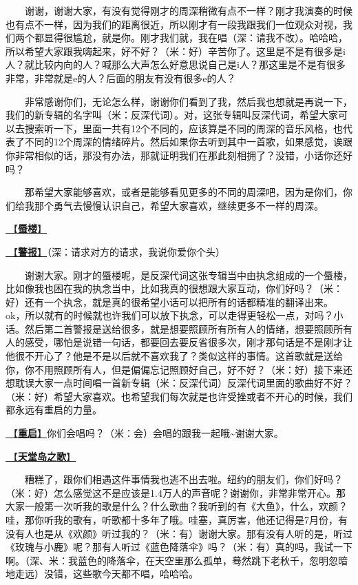 \documentclass[]{ctexbook}
\begin{document}
  谢谢，谢谢大家，有没有觉得刚才的周深稍微有点不一样？刚才我演奏的时候也有点不一样，因为我们的距离很近，所以刚才有一段我跟我们一位观众对视，我们两个都显得很尴尬，就是你。刚才我们就，我在唱（深：请我不改）。哈哈哈，所以希望大家跟我嗨起来，好不好？（米：好）辛苦你了。这里是不是有很多是i人？就比较内向的人？喊那么大声怎么好意思说自己是i人？那这里是不是有很多非常，非常就是e的人？后面的朋友有没有很多e的人？

  非常感谢你们，无论怎么样，谢谢你们看到了我，然后我也想就是再说一下，我们的新专辑的名字叫（米：反深代词）。对，这张专辑叫反深代词，希望大家可以去搜索听一下，里面一共有12个不同的，应该算是不同的周深的音乐风格，也代表了不同的12个周深的情绪碎片。然后如果你去听到其中一首歌，如果感觉，诶跟你非常相似的话，那没有办法，那就证明我们在那此刻相拥了？没错，小话你还好吗？

  那希望大家能够喜欢，或者是能够看见更多的不同的周深吧，因为是你们，你们给我那个勇气去慢慢认识自己，希望大家喜欢，继续更多不一样的周深。

\hyperref[mirage]{🎵【\textbf{蜃楼}】}

\hyperref[the-giver]{🎵【\textbf{警报}】}（深：请求对方的请求，我说你爱你个头）

  谢谢大家。刚才的蜃楼呢，是反深代词这张专辑当中由执念组成的一个蜃楼，比如像我也困在我的执念当中，比如我真的很想跟大家互动，你们好吗？（米：好）还有一个执念，就是真的很希望小话可以把所有的话都精准的翻译出来。ok，所以就有的时候就也许我们可以放下执念，可以走得更轻松一点，对吗？小话。然后第二首警报是送给很多，就是想要照顾所有所有人的情绪，想要照顾所有人的感受，哪怕是说错一句话，都要回去要反省很多次，刚才那句话是不是刚才让他很不开心了？他是不是以后就不喜欢我了？类似这样的事情。这首歌就是送给你，你不用照顾所有人，但是偏偏忘记照顾好自己，好不好？（米：好）接下来还想耽误大家一点时间唱一首新专辑（米：反深代词）反深代词里面的歌曲好不好？（米：好）希望大家喜欢。也希望我们每次就是也许受挫或者不开心的时候，我们都永远有重启的力量。

\hyperref[restart]{🎵【\textbf{重启}】}你们会唱吗？（米：会）会唱的跟我一起哦\textasciitilde 谢谢大家。

\hyperref[haven-song]{🎵【\textbf{天堂岛之歌}】}

  糟糕了，跟你们相遇这件事情我也逃不出去啦。纽约的朋友们，你们好吗？（米：好）怎么感觉这不是应该是1.4万人的声音呢？谢谢你，非常非常开心。那大家一般第一次听我的歌是什么？什么歌曲？我听到的有《大鱼》，什么，欢颜？哇，那你听我的歌有，听歌都十多年了哦。哇塞，真厉害，他还记得是7月份，有没有人也是从《欢颜》听过我的？（米：有）谢谢大家。那有没有人听的是，听过《玫瑰与小鹿》呢？那有人听过《蓝色降落伞》吗？（米：有）真的吗，我试一下啊。（深、米：我蓝色的降落伞，在天空里那么孤单，蓦然跳下老秋千，忽明忽暗地走远）没错，这些歌今天都不唱，哈哈哈。
\end{document}
